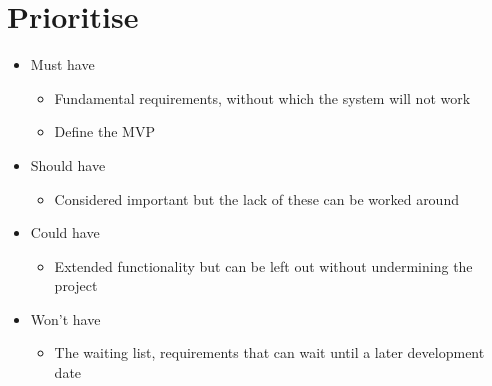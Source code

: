 \documentclass{article}[18pt]
\begin{document}
\section{Prioritise}
\begin{itemize}
	\item Must have
	\begin{itemize}
		\item Fundamental requirements, without which the system will not work
		\item Define the MVP
	\end{itemize}
	\item Should have
	\begin{itemize}
		\item Considered important but the lack of these can be worked around
	\end{itemize}
	\item Could have
	\begin{itemize}
		\item Extended functionality but can be left out without undermining the project
	\end{itemize}
	\item Won't have
	\begin{itemize}
		\item The waiting list, requirements that can wait until a later development date
	\end{itemize}
\end{itemize}
\end{document}
